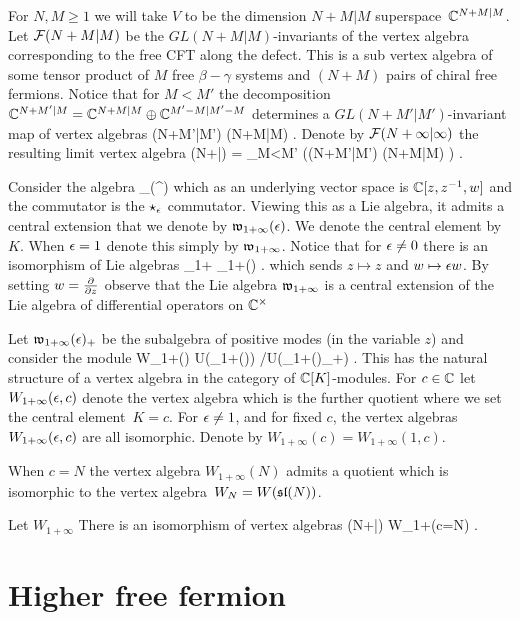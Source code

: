 \documentclass{amsart}
\begin{document}
For $N,M \geq 1$ we will take $V$ to be the dimension $N+M|M$ superspace~$\mathbb{C}^{N+M|M}$.
Let $\mathcal F(N+M|M)$ be the $GL(N+M|M)$-invariants of the vertex algebra corresponding to the free CFT along the defect.
This is a sub vertex algebra of some tensor product of $M$ free $\beta-\gamma$ systems and $(N+M)$ pairs of chiral free fermions.
Notice that for $M<M'$ the decomposition $\mathbb{C}^{N+M'|M} = \mathbb{C}^{N+M|M} \oplus \mathbb{C}^{M'-M|M'-M}$ determines a $GL(N+M'|M')$-invariant map of vertex algebras
\beqn
\cF (N+M'|M') \to \cF(N+M|M) .
\eeqn
Denote by $\mathcal F(N+\infty|\infty)$ the resulting limit vertex algebra
\beqn
\cF(N+\infty|\infty) = \lim_{M<M'} \left(\cF (N+M'|M') \to \cF(N+M|M) \right) .
\eeqn

Consider the algebra 
\beqn
\cO_\ep (\C^\times \times \C) 
\eeqn
which as an underlying vector space is $\mathbb{C}[z,z^{-1},w]$ and the commutator is the $\star_\epsilon$ commutator.
Viewing this as a Lie algebra, it admits a central extension that we denote by $\mathfrak{w}_{1+\infty}(\epsilon)$.
We denote the central element by~$K$.
When $\epsilon = 1$ denote this simply by $\mathfrak{w}_{1+\infty}$.
Notice that for $\epsilon \ne 0$ there is an isomorphism of Lie algebras
\beqn
{}_{1+\infty} \xto{\simeq} _{1+\infty}(\ep) .
\eeqn
which sends $z \mapsto z$ and $w \mapsto \epsilon w$.
By setting $w = \frac{\partial}{\partial z}$ observe that the Lie algebra $\mathfrak{w}_{1+\infty}$ is a central extension of the Lie algebra of differential operators on $\mathbb{C}^\times$

Let $\mathfrak{w}_{1+\infty}(\epsilon)_+$ be the subalgebra of positive modes (in the variable $z$) and consider the module
\beqn
W_{1+\infty}(\ep)  U(_{1+\infty}(\ep)) \slash {U(_{1+\infty}(\ep)_+)} .
\eeqn
This has the natural structure of a vertex algebra in the category of $\mathbb{C}[K]$-modules.
For $c \in \mathbb{C}$ let $W_{1+\infty}(\epsilon,c)$ denote the vertex algebra which is the further quotient where we set the central element~$K = c$. 
For $\epsilon \ne 1$, and for fixed $c$, the vertex algebras $W_{1+\infty}(\epsilon,c)$ are all isomorphic.
Denote by $W_{1+\infty}(c) = W_{1+\infty}(1,c)$.

When $c = N$ the vertex algebra $W_{1+\infty}(N)$ admits a quotient which is isomorphic to the vertex algebra~$W_N = W(\mathfrak{sl}(N))$.

\begin{prop}
Let $W_{1+\infty}$
There is an isomorphism of vertex algebras
\beqn
\cF(N+\infty|\infty) \simeq W_{1+\infty}(c=N) .
\eeqn
\end{prop}

\section{Higher free fermion} 
\end{document}

